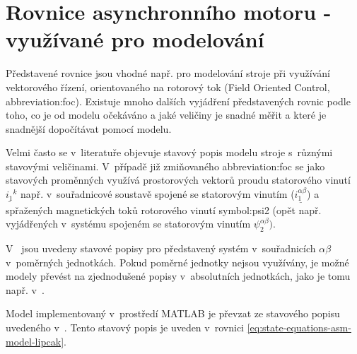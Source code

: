 \documentclass[a4paper, twoside, 11pt]{article}
\begin{document}
\section{Rovnice asynchronního motoru - využívané pro modelování}
Představené rovnice jsou vhodné např. pro modelování stroje při využívání vektorového řízení, orientovaného na rotorový tok (Field Oriented Control, \gls{abbreviation:foc}). Existuje mnoho dalších vyjádření představených rovnic podle toho, co je od modelu očekáváno a jaké veličiny je snadné měřit a které je snadnější dopočítávat pomocí modelu.\par
Velmi často se v~literatuře objevuje stavový popis modelu stroje s~různými stavovými veličinami. V~případě již zmiňovaného \gls{abbreviation:foc} se jako stavových proměnných využívá prostorových vektorů proudu statorového vinutí $\underline{i_1}^k$ např. v~souřadnicové soustavě spojené se statorovým vinutím ($\underline{i_1^{\alpha\beta}}$) a spřažených magnetických toků rotorového vinutí \gls{symbol:psi2} (opět např. vyjádřených v~systému spojeném se statorovým vinutím $\psi_2^{\alpha\beta})$.\par
V~\cite{popescu-induction-motor-modelling-for-vector-control-purposes} jsou uvedeny stavové popisy pro představený systém v~souřadnicích $\alpha\beta$ v~poměrných jednotkách. Pokud poměrné jednotky nejsou využívány, je možné modely převést na zjednodušené popisy v~absolutních jednotkách, jako je tomu např. v~\cite{lipcak-bauer-ept-moodle}.\par
Model implementovaný v~prostředí MATLAB je převzat ze stavového popisu uvedeného v~\cite{lipcak-bauer-ept-moodle}. Tento stavový popis je uveden v~rovnici \ref{eq:state-equations-asm-model-lipcak}. 
\end{document}
